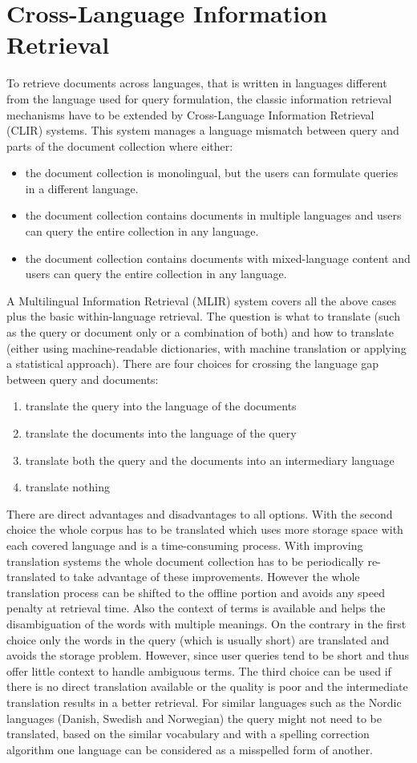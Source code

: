 \documentclass[journal]{IEEEtran}
\begin{document}
\section{Cross-Language Information Retrieval}
To retrieve documents across languages, that is written in languages different from the language used for query formulation, the classic information retrieval mechanisms have to be extended by Cross-Language Information Retrieval (CLIR) systems.
This system manages a language mismatch between query and parts of the document collection where either:
\begin{itemize}
	\item the document collection is monolingual, but the users can formulate queries in a different language.
	\item the document collection contains documents in multiple languages and users can query the entire collection in any language.
	\item the document collection contains documents with mixed-language content and users can query the entire collection in any language.
\end{itemize}
A Multilingual Information Retrieval (MLIR) system covers all the above cases plus the basic within-language retrieval.
The question is what to translate (such as the query or document only or a combination of both) and how to translate (either using machine-readable dictionaries, with machine translation or applying a statistical approach).
There are four choices for crossing the language gap between query and documents:
\begin{enumerate}
	\item translate the query into the language of the documents
	\item translate the documents into the language of the query
	\item translate both the query and the documents into an intermediary language
	\item translate nothing
\end{enumerate}
There are direct advantages and disadvantages to all options.
With the second choice the whole corpus has to be translated which uses more storage space with each covered language and is a time-consuming process.
With improving translation systems the whole document collection has to be periodically re-translated to take advantage of these improvements.
However the whole translation process can be shifted to the offline portion and avoids any speed penalty at retrieval time.
Also the context of terms is available and helps the disambiguation of the words with multiple meanings.
On the contrary in the first choice only the words in the query (which is usually short) are translated and avoids the storage problem.
However, since user queries tend to be short and thus offer little context to handle ambiguous terms.
The third choice can be used if there is no direct translation available or the quality is poor and the intermediate translation results in a better retrieval.
For similar languages such as the Nordic languages (Danish, Swedish and Norwegian) the query might not need to be translated, based on the similar vocabulary and with a spelling correction algorithm one language can be considered as a misspelled form of another.
\end{document}
